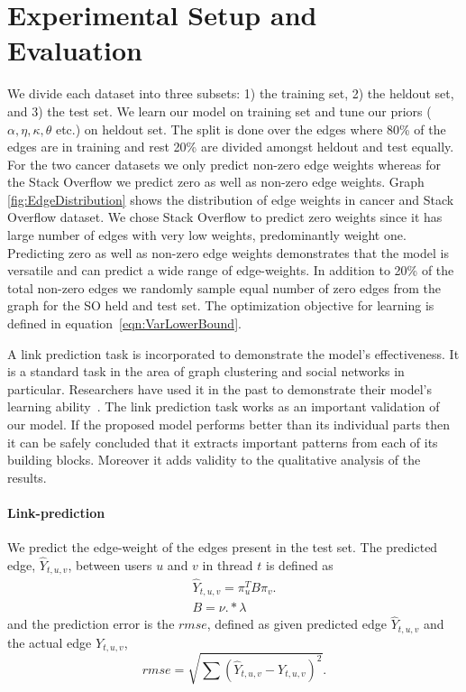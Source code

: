 \documentclass{sig-alternate}
\begin{document}
\section{Experimental Setup and Evaluation}
\label{sec:setup}
We divide each dataset into three subsets: 1) the training set, 2) the heldout set,
and 3) the test set. We learn our model on training set and tune our priors 
($\alpha, \eta, \kappa, \theta$ etc.) on heldout set. The split is done over the
edges where 80\% of the edges are in training and rest 20\% are divided amongst
heldout and test equally. 
For the two cancer datasets we only predict non-zero edge weights whereas for
the Stack Overflow we predict zero as well as non-zero 
edge weights.
Graph \ref{fig:EdgeDistribution} shows the distribution of edge weights in
cancer and Stack Overflow dataset. We chose Stack Overflow to predict
zero weights since it has large number of edges with very low weights,
predominantly weight one. Predicting zero as well as non-zero edge weights
demonstrates that the model is versatile and can predict a wide range of 
edge-weights. In addition to 20\% of the total
non-zero edges we randomly sample equal number of zero edges from the graph for
the SO held and test set.
The optimization objective for learning is defined in
equation~\ref{eqn:VarLowerBound}.

A link prediction task is incorporated to demonstrate the model's effectiveness.
It is a standard task in the area of graph clustering and social networks in
particular. Researchers have
used it in the past to demonstrate their model's learning 
ability~\cite{Nallapati:2008:JLT:1401890.1401957}.   
The link prediction task works as an important validation of our model. If the
proposed model performs better than its individual parts then it can be safely
concluded that it extracts important patterns from each of its building
blocks. Moreover it adds validity to the qualitative analysis of the results. 

\paragraph{Link-prediction} 
  
 We predict the edge-weight of the edges
present in the test set. The predicted edge, $\hat{Y}_{t,u,v}$, between users $u$ and
$v$ in thread $t$ is  defined as 
\begin{align}
\hat{Y}_{t,u,v} = \pi^T_uB\pi_v\label{eqn:prediction}.\\
B=\nu.*\lambda\label{eqn:blockMat}
\end{align}
and the prediction error is the $rmse$, defined as given predicted edge
$\hat{Y}_{t,u,v}$ and the actual edge $Y_{t,u,v}$,
\begin{equation}
rmse=\sqrt{\sum(\hat{Y}_{t,u,v}-Y_{t,u,v})^2}.
\end{equation}
\end{document}
